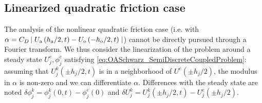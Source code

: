 \subsection{Linearized quadratic friction case}
\label{sec:OASchwarz_linearized}
The analysis of the nonlinear quadratic friction case (i.e. with $\alpha = C_D\left|\right.U_{\rm a}\left(h_{\rm a} / 2, t\right) - U_{\rm o}\left(- h_{\rm o}/2, t\right)\left.\right|$)
cannot be directly pursued through a Fourier transform.
We thus consider the linearization of the problem 
around a steady state $U^e_j, \phi^e_j$ satisfying
\eqref{eq:OASchwarz_SemiDiscreteCoupledProblem}:
assuming that $U^k_j (\pm h_j/2, t)$ is in a neighborhood of $U^e(\pm h_j/2)$, the modulus in $\alpha$
is non-zero and
we can differentiate $\alpha$.
Differences with the steady state are noted $\delta \phi_j^k = \phi^k_j(0,t) - \phi_j^e(0)$ and $\delta U_j^k = U_j^k(\pm h_j/2, t) - U^e_j(\pm h_j/2)$.

